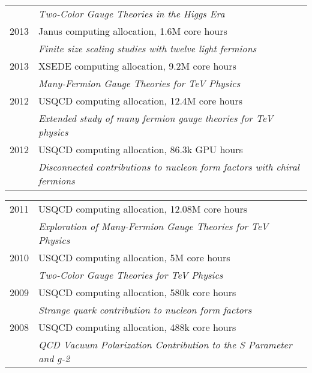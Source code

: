 \begin{spacelist}
\begin{tabular}[t]{cl}
           & \textit{Two-Color Gauge Theories in the Higgs Era}                                                   \\[6 pt]
      2013 & Janus computing allocation, 1.6M core hours                                                          \\ %
           & \textit{Finite size scaling studies with twelve light fermions}                                      \\[6 pt]
      2013 & XSEDE computing allocation, 9.2M core hours                                                          \\ %
           & \textit{Many-Fermion Gauge Theories for TeV Physics}                                                 \\[6 pt]
      2012 & USQCD computing allocation, 12.4M core hours                                                         \\ %
           & \textit{Extended study of many fermion gauge theories for TeV physics}                               \\[6 pt]
      2012 & USQCD computing allocation, 86.3k GPU hours                                                          \\ %
           & \textit{Disconnected contributions to nucleon form factors with chiral fermions}                     \\[6 pt]
    \end{tabular} %
    \begin{tabular}[t]{cl}
      2011 & USQCD computing allocation, 12.08M core hours                                                        \\ %
           & \textit{Exploration of Many-Fermion Gauge Theories for TeV Physics}                                  \\[6 pt]
      2010 & USQCD computing allocation, 5M core hours                                                            \\ %
           & \textit{Two-Color Gauge Theories for TeV Physics}                                                    \\[6 pt]
      2009 & USQCD computing allocation, 580k core hours                                                          \\ %
           & \textit{Strange quark contribution to nucleon form factors}                                          \\[6 pt]
      2008 & USQCD computing allocation, 488k core hours                                                          \\ %
           & \textit{QCD Vacuum Polarization Contribution to the S Parameter and g-2}                             \\
    \end{tabular}
\end{spacelist}
